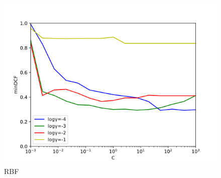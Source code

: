 \documentclass[english]{report}
\begin{document}
\begin{figure}[h!]
    \includegraphics[scale = 0.5]{../../images/validation/SVM_RBF_minDCF_comparison.png}
    \centering
    \caption{RBF}
\end{figure}
\end{document}
